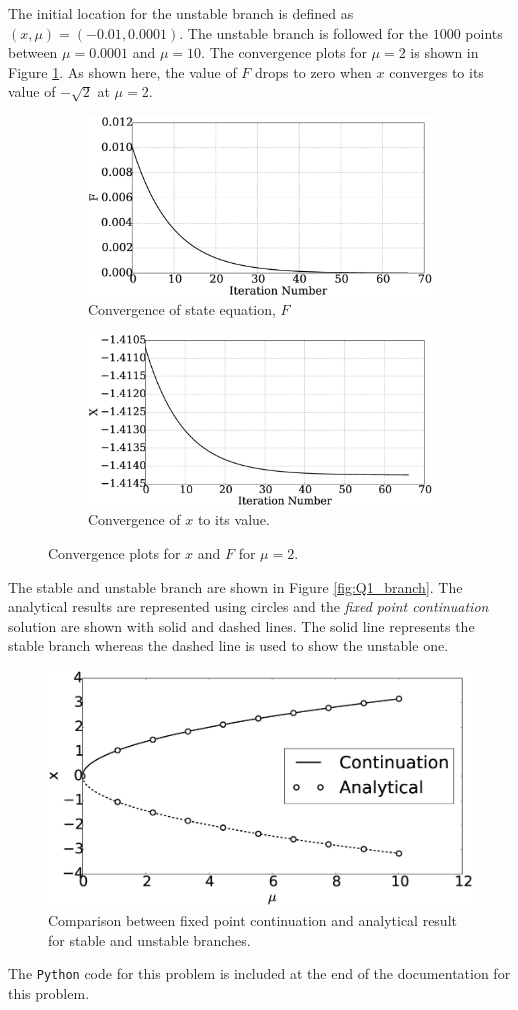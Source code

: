 The initial location for the unstable branch is defined as $(x, \mu) = (-0.01, 0.0001)$. The unstable branch is followed for the $1000$ points between $\mu = 0.0001$ and $\mu = 10$. The convergence plots for $\mu = 2$ is shown in Figure \ref{fig:Q1_convergenceFORunstable}. As shown here, the value of $F$ drops to zero when $x$ converges to its value of $-\sqrt{2}$ at $\mu = 2$.
%
\begin{figure}[h]
	\centering
	\begin{subfigure}[h]{8.0 cm}
		\includegraphics[width=8.0 cm]{figure/Q1/F_-2.eps}
		\caption{Convergence of state equation, $F$}
	\end{subfigure}
	\begin{subfigure}[h]{8.0 cm}
        \includegraphics[width=8.0 cm]{figure/Q1/X_-2.eps}
		\caption{Convergence of $x$ to its value.}
    \end{subfigure}
    \caption{Convergence plots for $x$ and $F$ for $\mu = 2$.}
    \label{fig:Q1_convergenceFORunstable}
\end{figure}
%

The stable and unstable branch are shown in Figure \eqref{fig:Q1_branch}. The analytical results are represented using circles and the \emph{fixed point continuation} solution are shown with solid and dashed lines. The solid line represents the stable branch whereas the dashed line is used to show the unstable one.
%
\begin{figure}[h]
	\centering
	\includegraphics[width=12.0cm]{figure/Q1/bifurcation.eps}
	\caption{Comparison between fixed point continuation and analytical result for stable and unstable branches.}
	\label{fig:Q1_branch}
\end{figure}
%
The \texttt{Python} code for this problem is included at the end of the documentation for this problem.